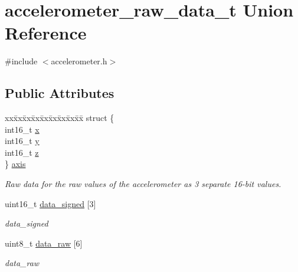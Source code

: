 \hypertarget{unionaccelerometer__raw__data__t}{}\section{accelerometer\+\_\+raw\+\_\+data\+\_\+t Union Reference}
\label{unionaccelerometer__raw__data__t}


{\ttfamily \#include $<$accelerometer.\+h$>$}

\subsection*{Public Attributes}
\begin{DoxyCompactItemize}
\item 
\begin{tabbing}
xx\=xx\=xx\=xx\=xx\=xx\=xx\=xx\=xx\=\kill
struct \{\\
\>int16\_t \hyperlink{unionaccelerometer__raw__data__t_a735f5a9c1185e9fbe97889444d14f578}{x}\\
\>int16\_t \hyperlink{unionaccelerometer__raw__data__t_a722cb8e16ee4ef3aba5593b935e00a43}{y}\\
\>int16\_t \hyperlink{unionaccelerometer__raw__data__t_a86a93d9e4affc3dc0156eff12dc29c30}{z}\\
\} \hyperlink{unionaccelerometer__raw__data__t_adcc370ba6615711ae52eb03e28d85420}{axis}\\

\end{tabbing}\begin{DoxyCompactList}\small\item\em Raw data for the raw values of the accelerometer as 3 separate 16-\/bit values. \end{DoxyCompactList}\item 
uint16\+\_\+t \hyperlink{unionaccelerometer__raw__data__t_a950284c393c296664512a28ed729cb62}{data\+\_\+signed} \mbox{[}3\mbox{]}
\begin{DoxyCompactList}\small\item\em data\+\_\+signed \end{DoxyCompactList}\item 
uint8\+\_\+t \hyperlink{unionaccelerometer__raw__data__t_a5e7e0fcbf2dbf3ec6a03f1e9c0a926ec}{data\+\_\+raw} \mbox{[}6\mbox{]}
\begin{DoxyCompactList}\small\item\em data\+\_\+raw \end{DoxyCompactList}\end{DoxyCompactItemize}


